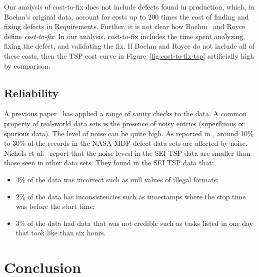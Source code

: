 \documentclass{sig-alternate}
\newcommand{\todo}[1]{\textcolor{Maroon}{TODO: #1}}
\newcommand{\bi}{\begin{itemize}}%
\newcommand{\ei}{\end{itemize}}
\newcommand{\fig}[1]{Figure~\ref{fig:#1}}
\begin{document}
Our analysis of cost-to-fix does not include defects found in production, which, in Boehm's original data, account for costs up to 200 times the cost of finding and fixing defects in Requirements. Further, it is not clear how Boehm~\cite{Boehm81} and Royce~\cite{Royce98} define \emph{cost-to-fix}. In our analysis, cost-to-fix includes the time spent analyzing, fixing the defect, and validating the fix. If Boehm and Royce do not include all of these costs, then the TSP cost curve in \fig{cost-to-fix-tsp} artificially high by comparison.

\subsection{Reliability}
A previous paper~\cite{shirai14} has applied a range of sanity checks to the data.
A common property of real-world data sets is the presence
of noisy entries (superfluous  or spurious data). 
The level of noise can be quite high. As reported
in \cite{shepperd12}, around
10\% to 30\%
of the records in the NASA MDP defect data sets are
affected by noise. Nichols et al.~\cite{shirai14}  report that
the noise levesl in the SEI TSP data are smaller than those seen
in other data sets. They found in the SEI TSP data that:\bi 
\item
4\% of the data was incorrect such as  null values of illegal formats;
\item  2\% of the data has inconsistencies such as timestamps
where the stop time was before the start time;
\item 3\% of the data had data that was not credible
such as tasks listed in one day that took like than six hours.
\ei 

 

 
 
 \section{Conclusion}
 
\end{document}
